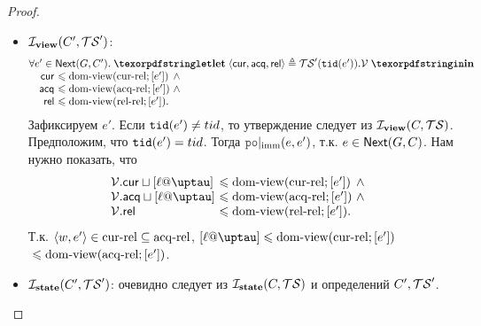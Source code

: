\begin{proof}
\begin{itemize}
\begin{itemize}
        \item $\mathcal{I}_{\rm \bf view}(C', \mathcal{TS}')$:
          \[\inarr{
  \forall e' \in \nextset(G, C'). \; \letdef{\tup{\viewCur, \viewAcq, \viewfRel}}{\TSf'(\lTID(e')).\View}\\
  \quad
  \begin{array}{@{}r@{~}l@{~}l}
    \viewCur  & \le \domView(\curRel; [e']) & \land {} \\
    \viewAcq  & \le \domView(\acqRel; [e']) & \land {} \\
    \viewfRel & \le \domView(\relRel; [e']). \\
  \end{array}
          }\]
          Зафиксируем $e'$. Если ${\mathtt{tid}}(e') \neq tid$, то утверждение следует из $\mathcal{I}_{\rm \bf view}(C, \mathcal{TS})$.
          Предположим, что ${\mathtt{tid}}(e') = tid$. Тогда $\imm{\lPO}(e, e')$, т.к. $e \in {\sf Next}(G, C)$.
          Нам нужно показать, что
          \[\inarr{
  \begin{array}{@{}l@{~}l@{~}l}
    \View.\viewCur \sqcup [\loc @ \tau] & \le \domView(\curRel; [e']) & \land {} \\
    \View.\viewAcq \sqcup [\loc @ \tau] & \le \domView(\acqRel; [e']) & \land {} \\
    \View.\viewfRel & \le \domView(\relRel; [e']). \\
  \end{array}
          }\]
          Т.к. ${\langle{w, e'}\rangle} \in {\rm cur\text{-}rel} \subseteq {\rm acq\text{-}rel}$,
          $[\loc @ \tau] \le \domView(\curRel; [e'])$
          ${} \leqslant {\rm dom\text{-}view}({\rm acq\text{-}rel}; [e'])$.
        \item $\mathcal{I}_{\rm \bf state}(C', \mathcal{TS}')$:
          очевидно следует из $\mathcal{I}_{\rm \bf state}(C, \mathcal{TS})$ и определений $C', \mathcal{TS}'$.
      \end{itemize}

      \end{itemize}


\end{proof}

